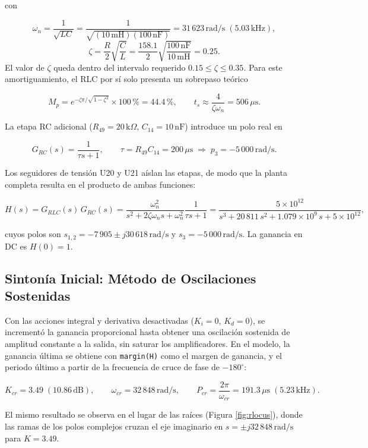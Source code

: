 \documentclass[pdflatex,sn-mathphys-num]{sn-jnl}%
\begin{document}
con

\[
\omega_n=\frac{1}{\sqrt{LC}}=\frac{1}{\sqrt{(10\,\text{mH})(100\,\text{nF})}}=31\,623\,\text{rad/s}\;(5.03\,\text{kHz}),
\]
$$
\zeta=\frac{R}{2}\sqrt{\frac{C}{L}}=\frac{158.1}{2}\sqrt{\frac{100\,\text{nF}}{10\,\text{mH}}}=0.25 .$$
El valor de $\zeta$ queda dentro del intervalo requerido $0.15\leq\zeta\leq0.35$. Para este amortiguamiento, el RLC por sí solo presenta un sobrepaso teórico

\[
M_p=e^{-\zeta\pi/\sqrt{1-\zeta^2}}\times100\,\%=44.4\,\%,
\qquad
t_s\approx\frac{4}{\zeta\omega_n}=506\,\mu\text{s}.
\]

La etapa RC adicional ($R_{49}=20\,\text{k}\Omega$, $C_{14}=10\,\text{nF}$) introduce un polo real en

\[
G_{RC}(s)=\frac{1}{\tau s+1},\qquad \tau=R_{49}C_{14}=200\,\mu\text{s}\;\Rightarrow\;p_3=-5\,000\,\text{rad/s}.
\]

Los seguidores de tensión U20 y U21 aíslan las etapas, de modo que la planta completa resulta en el producto de ambas funciones:

\[
H(s)=G_{RLC}(s)\,G_{RC}(s)
=
\frac{\omega_n^2}{s^2+2\zeta\omega_n s+\omega_n^2}\frac{1}{\tau s+1}
=
\frac{5\times10^{12}}{s^3+20\,811\,s^2+1.079\times10^{9}\,s+5\times10^{12}},
\]

cuyos polos son $s_{1,2}=-7\,905\pm j30\,618\,\text{rad/s}$ y $s_3=-5\,000\,\text{rad/s}$. La ganancia en DC es $H(0)=1$.

\subsection{Sintonía Inicial: Método de Oscilaciones Sostenidas}

Con las acciones integral y derivativa desactivadas ($K_i=0$, $K_d=0$), se incrementó la ganancia proporcional hasta obtener una oscilación sostenida de amplitud constante a la salida, sin saturar los amplificadores. En el modelo, la ganancia última se obtiene con \texttt{margin(H)} como el margen de ganancia, y el periodo último a partir de la frecuencia de cruce de fase de $-180^\circ$:

\[
K_{cr}=3.49\;(10.86\,\text{dB}),\qquad \omega_{cr}=32\,848\,\text{rad/s},\qquad P_{cr}=\frac{2\pi}{\omega_{cr}}=191.3\,\mu\text{s}\;(5.23\,\text{kHz}).
\]

El mismo resultado se observa en el lugar de las raíces (Figura \ref{fig:rlocus}), donde las ramas de los polos complejos cruzan el eje imaginario en $s=\pm j32\,848\,\text{rad/s}$ para $K=3.49$.
\end{document}
